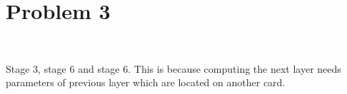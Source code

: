 \section{Problem 3}~\label{sec:prob3}

Stage 3, stage 6 and stage 6.
This is because computing the next layer needs
parameters of previous layer which are located
on another card.
